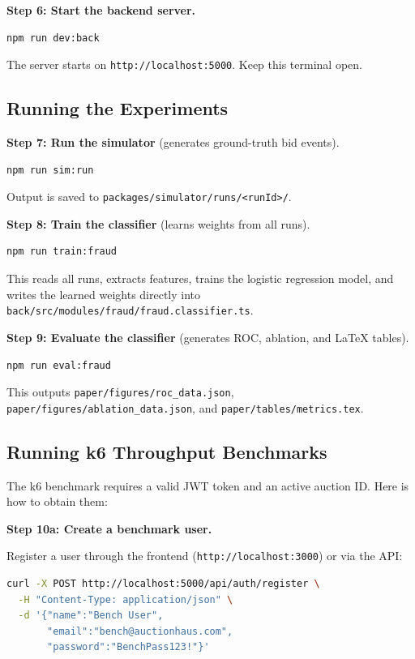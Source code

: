 \documentclass[11pt]{article}
\begin{document}
\textbf{Step 6: Start the backend server.}
\begin{lstlisting}[language=bash]
npm run dev:back
\end{lstlisting}
The server starts on \texttt{http://localhost:5000}. Keep this terminal
open.

\subsection{Running the Experiments}

\textbf{Step 7: Run the simulator} (generates ground-truth bid events).
\begin{lstlisting}[language=bash]
npm run sim:run
\end{lstlisting}
Output is saved to \texttt{packages/simulator/runs/<runId>/}.

\textbf{Step 8: Train the classifier} (learns weights from all runs).
\begin{lstlisting}[language=bash]
npm run train:fraud
\end{lstlisting}
This reads all runs, extracts features, trains the logistic regression
model, and writes the learned weights directly into
\texttt{back/src/modules/fraud/fraud.classifier.ts}.

\textbf{Step 9: Evaluate the classifier} (generates ROC, ablation,
and LaTeX tables).
\begin{lstlisting}[language=bash]
npm run eval:fraud
\end{lstlisting}
This outputs \texttt{paper/figures/roc\_data.json},
\texttt{paper/figures/ablation\_data.json}, and
\texttt{paper/tables/metrics.tex}.

\subsection{Running k6 Throughput Benchmarks}

The k6 benchmark requires a valid JWT token and an active auction ID.
Here is how to obtain them:

\textbf{Step 10a: Create a benchmark user.}

Register a user through the frontend (\texttt{http://localhost:3000})
or via the API:
\begin{lstlisting}[language=bash]
curl -X POST http://localhost:5000/api/auth/register \
  -H "Content-Type: application/json" \
  -d '{"name":"Bench User",
       "email":"bench@auctionhaus.com",
       "password":"BenchPass123!"}'
\end{lstlisting}
\end{document}
